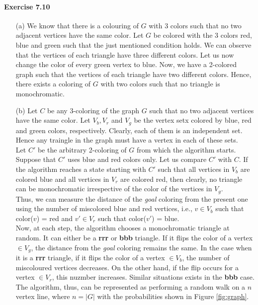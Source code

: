 \paragraph{Exercise 7.10}
\begin{enumerate}
  \item[(a)] We know that there is a colouring of $G$ with 3 colors such that no
  two adjacent vertices have the same color. Let $G$ be colored with the 3 colors
  red, blue and green such that the just mentioned condition holds. We can observe
  that the vertices of each triangle have three different colors. Let us now change
  the color of every green vertex to blue. Now, we have a 2-colored graph such
  that the vertices of each triangle have two different colors. Hence, there
  exists a coloring of $G$ with two colors such that no triangle is monochromatic.

  \item[(b)] Let $C$ be any 3-coloring of the graph $G$ such that no two adjacent
  vertices have the same color. Let $V_b,V_r$ and $V_g$ be the vertex setx colored
  by blue, red and green colors, respectively. Clearly, each of them is an independent
  set. Hence any traingle in the graph must have a vertex in each of these sets. \\
  Let $C'$ be the arbitrary 2-coloring of $G$ from which the algorithm starts.
  Suppose that $C'$ uses blue and red colors only. Let us compare $C'$ with $C$.
  If the algorithm reaches a state starting with $C'$ such that all vertices in $V_b$
  are colored blue and all vertices in $V_r$ are colored red, then clearly, no
  triangle can be monochromatic irrespective of the color of the vertices in $V_g$. \\
  Thus, we can measure the distance of the \textit{goal} coloring from the present
  one using the number of miscolored blue and red vertices, i.e., $v \in V_b$ such
  that color($v$) = red and $v'\in V_r$ such that color($v'$) = blue. \\
  Now, at each step, the algorithm chooses a monochromatic triangle at random.
  It can either be a \textbf{rrr} or \textbf{bbb} triangle. If it flips the color
  of a vertex $\in V_g$, the distance from the \textit{goal} coloring remains the
  same. In the case when it is a \textbf{rrr} triangle, if it flips the color of
  a vertex $\in V_b$, the number of miscoloured vertices decreases. On the other
  hand, if the flip occurs for a vertex $\in V_r$, this nuzmber increases.
  Similar situations exists in the \textbf{bbb} case. \\
  The algorithm, thus, can be represented as performing a random walk on a $n$
  vertex line, where $n = |G|$ with the probabilities shown in Figure \ref{fig:graph}.
  \begin{figure}[h]
    \setlength\intextsep{0pt}
    \centering
\end{figure}
\end{enumerate}
